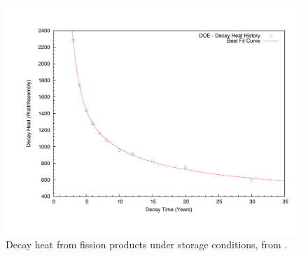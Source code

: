 \documentclass[12pt]{article}
\begin{document}
\begin{figure}[!htbp]
\includegraphics[width=5.5in]{fig_5_1.pdf}
\caption{Decay heat from fission products under storage conditions, from \cite{EPRI1003135}.}
\label{fig:fig_5_1_epri}
\end{figure}
\end{document}
